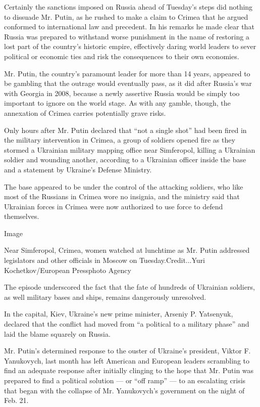 Certainly the sanctions imposed on Russia ahead of Tuesday's steps did
nothing to dissuade Mr. Putin, as he rushed to make a claim to Crimea
that he argued conformed to international law and precedent. In his
remarks he made clear that Russia was prepared to withstand worse
punishment in the name of restoring a lost part of the country's
historic empire, effectively daring world leaders to sever political or
economic ties and risk the consequences to their own economies.

Mr. Putin, the country's paramount leader for more than 14 years,
appeared to be gambling that the outrage would eventually pass, as it
did after Russia's war with Georgia in 2008, because a newly assertive
Russia would be simply too important to ignore on the world stage. As
with any gamble, though, the annexation of Crimea carries potentially
grave risks.

Only hours after Mr. Putin declared that ``not a single shot'' had been
fired in the military intervention in Crimea, a group of soldiers opened
fire as they stormed a Ukrainian military mapping office near
Simferopol, killing a Ukrainian soldier and wounding another, according
to a Ukrainian officer inside the base and a statement by Ukraine's
Defense Ministry.

The base appeared to be under the control of the attacking soldiers, who
like most of the Russians in Crimea wore no insignia, and the ministry
said that Ukrainian forces in Crimea were now authorized to use force to
defend themselves.

Image

Near Simferopol, Crimea, women watched at lunchtime as Mr. Putin
addressed legislators and other officials in Moscow on
Tuesday.Credit...Yuri Kochetkov/European Pressphoto Agency

The episode underscored the fact that the fate of hundreds of Ukrainian
soldiers, as well military bases and ships, remains dangerously
unresolved.

In the capital, Kiev, Ukraine's new prime minister, Arseniy P.
Yatsenyuk, declared that the conflict had moved from ``a political to a
military phase'' and laid the blame squarely on Russia.

Mr. Putin's determined response to the ouster of Ukraine's president,
Viktor F. Yanukovych, last month has left American and European leaders
scrambling to find an adequate response after initially clinging to the
hope that Mr. Putin was prepared to find a political solution --- or
``off ramp'' --- to an escalating crisis that began with the collapse of
Mr. Yanukovych's government on the night of Feb. 21.

